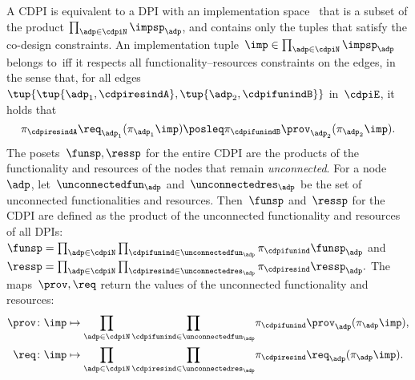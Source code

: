 A CDPI is equivalent to a DPI with an implementation space~\impsp
that is a subset of the product $\prod_{\adp\in\cdpiN}\impsp_{\adp}$,
and contains only the tuples that satisfy the co-design constraints.
An implementation tuple~$\imp\in\prod_{\adp\in\cdpiN}\impsp_{\adp}$
belongs to~\impsp iff it respects all functionality--resources
constraints on the edges, in the sense that, for all edges~$\tup{\tup{ \adp_1,\cdpiresindA} ,\tup{\adp_2,\cdpifunindB}}$
in~$\cdpiE$, it holds that
\begin{equation*}
    \pi_{\cdpiresindA}\req_{\adp_1}(\pi_{\adp_1}\imp)\posleq\pi_{\cdpifunindB}\prov_{\adp_2}(\pi_{\adp_2}\imp).
\end{equation*}
The posets~$\funsp,\ressp$ for the entire CDPI are the products
of the functionality and resources of the nodes that remain \emph{unconnected}.
For a node~$\adp$, let~$\unconnectedfun_{\adp}$ and~$\unconnectedres_{\adp}$
be the set of unconnected functionalities and resources.
Then~$\funsp$ and~$\ressp$ for the CDPI are defined as the product of the unconnected functionality and resources of all DPIs:
~$\funsp=\prod_{\adp\in\cdpiN}\prod_{\cdpifunind\in\unconnectedfun_{\adp}}\pi_{\cdpifunind}\funsp_{\adp}$
and~$\ressp=\prod_{\adp\in\cdpiN}\prod_{\cdpiresind\in\unconnectedres_{\adp}}\pi_{\cdpiresind}\ressp_{\adp}.$
The maps~$\prov,\req$ return the values of the unconnected functionality
and resources:
\begin{equation*}
    \begin{aligned}
        \prov\colon \imp & \mapsto{\scriptstyle {\displaystyle \prod_{\adp\in\cdpiN}\prod_{\cdpifunind\in\unconnectedfun_{\adp}}}}\pi_{\cdpifunind}\prov_{\adp}(\pi_{\adp}\imp),\\
        \req\colon \imp & \mapsto{\displaystyle \prod_{\adp\in\cdpiN}\prod_{\cdpiresind\in\unconnectedres_{\adp}}}\pi_{\cdpiresind}\req_{\adp}(\pi_{\adp}\imp).
    \end{aligned}
\end{equation*}

